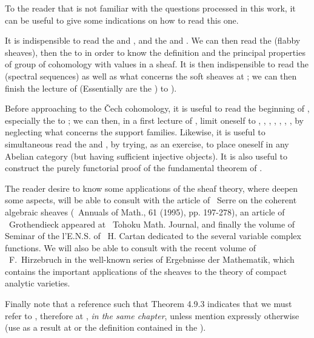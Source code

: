 \oldpage[VII]
To the reader that is not familiar with the questions processed in this work, 
it can be useful to give some indications on how to read this one.

It is indispensible to read the  and , and the  and . 
We can then read the  (flabby sheaves), then the  to  in order to know the definition and the principal properties of group of cohomology with values in a sheaf. 
It is then indispensible to read the  (spectral sequences) as well as what concerns the soft sheaves at ; 
we can then finish the lecture of  (Essentially are the ) to ).

Before approaching to the \v{C}ech cohomology, it is useful to read the beginning of , especially the  to ; 
we can then, in a first lecture of , limit oneself to , , , , , , , by neglecting what concerns the support families. 
Likewise, it is useful to simultaneous read the  and , by trying, as an exercise, to place oneself in any Abelian category (but having sufficient injective objects). 
It is also useful to construct the purely functorial proof of the fundamental theorem of .

The reader desire to know some applications of the sheaf theory, where deepen some aspects, will be able to consult with the article of ~Serre on the coherent algebraic sheaves (~Annuals of Math., 61 (1995), pp. 197-278), 
an article of ~Grothendieck appeared at ~Tohoku Math. Journal, and finally the volume of Seminar of the l'E.N.S. of ~H. Cartan dedicated to the several variable complex functions. 
\oldpage[VIII]
We will also be able to consult with the recent volume of ~F.~Hirzebruch in the well-known series of Ergebnisse der Mathematik, which contains the important applications of the sheaves to the theory of compact analytic varieties. 

Finally note that a reference such that Theorem 4.9.3 indicates that we must refer to , therefore at , \emph{in the same chapter}, unless mention expressly otherwise 
(use as a result at \sref[II] or the definition contained in the \sref[I]).